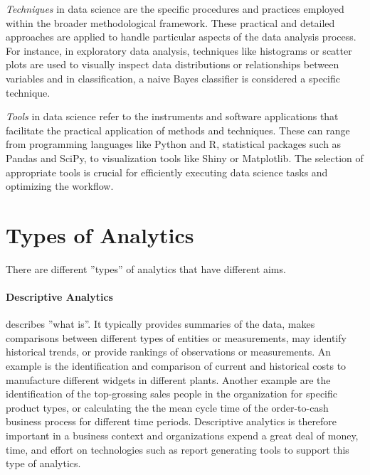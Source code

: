 \emph{Techniques} in data science are the specific procedures and practices employed within the broader methodological framework. These practical and detailed approaches are applied to handle particular aspects of the data analysis process. For instance, in exploratory data analysis, techniques like histograms or scatter plots are used to visually inspect data distributions or relationships between variables and in classification, a naive Bayes classifier is considered a specific technique.

\emph{Tools} in data science refer to the instruments and software applications that facilitate the practical application of methods and techniques. These can range from programming languages like Python and R, statistical packages such as Pandas and SciPy, to visualization tools like Shiny or Matplotlib. The selection of appropriate tools is crucial for efficiently executing data science tasks and optimizing the workflow.

\section{Types of Analytics}

There are different ''types'' of analytics that have different aims. 

\paragraph*{Descriptive Analytics} describes ''what is''. It typically provides summaries of the data, makes comparisons between different types of entities or measurements, may identify historical trends, or provide rankings of observations or measurements. An example is the identification and comparison of current and historical costs to manufacture different widgets in different plants. Another example are the identification of the top-grossing sales people in the organization for specific product types, or calculating the the mean cycle time of the order-to-cash business process for different time periods. Descriptive analytics is therefore important in a business context and organizations expend a great deal of money, time, and effort on technologies such as report generating tools to support this type of analytics. 

